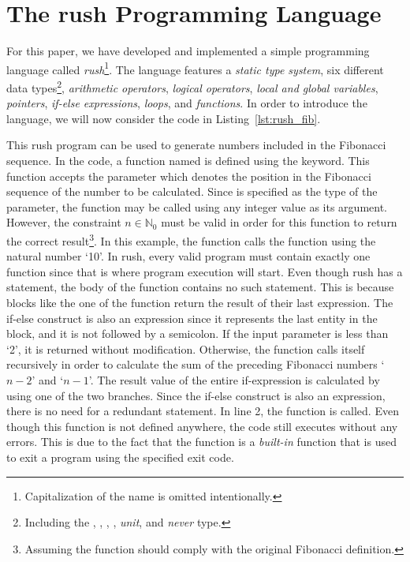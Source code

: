 \newpage %
\section{The rush Programming Language}

For this paper, we have developed and implemented a simple programming language called \emph{rush}\footnote{Capitalization of the name is omitted intentionally.}.
The language features a \emph{static type system}, six different data types\footnote{Including the , , , , \emph{unit}, and \emph{never} type.}, \emph{arithmetic operators}, \emph{logical operators}, \emph{local and global variables}, \emph{pointers}, \emph{if-else expressions}, \emph{loops}, and \emph{functions}.
In order to introduce the language, we will now consider the code in Listing~\ref{lst:rush_fib}.


This rush program can be used to generate numbers included in the Fibonacci sequence.
In the code, a function named  is defined using the  keyword.
This function accepts the parameter  which denotes the position in the Fibonacci sequence of the number to be calculated.
Since  is specified as the type of the parameter, the function may be called using any integer value as its argument.
However, the constraint $n \in \mathbb{N}_0$ must be valid in order for this function to return the correct result\footnote{Assuming the function should comply with the original Fibonacci definition.}.
In this example, the  function calls the  function using the natural number `10'.
In rush, every valid program must contain exactly one  function since that is where program execution will start.
Even though rush has a  statement, the body of the  function contains no such statement.
This is because blocks like the one of the function  return the result of their last expression.
The if-else construct is also an expression since it represents the last entity in the block, and it is not followed by a semicolon.
If the input parameter  is less than `2', it is returned without modification.
Otherwise, the function calls itself recursively in order to calculate the sum of the preceding Fibonacci numbers `$n - 2$' and `$n - 1$'.
The result value of the entire if-expression is calculated by using one of the two branches.
Since the if-else construct is also an expression, there is no need for a redundant  statement.
In line 2, the  function is called.
Even though this function is not defined anywhere, the code still executes without any errors.
This is due to the fact that the  function is a \emph{built-in} function that is used to exit a program using the specified exit code.

